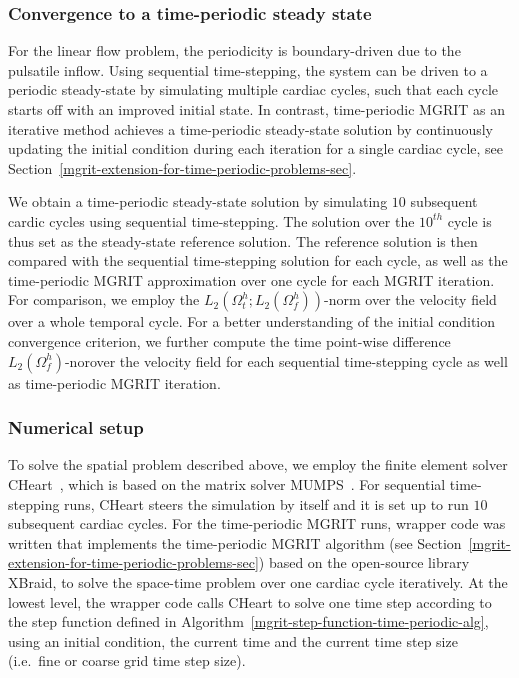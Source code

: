 \documentclass[3p]{elsarticle}
\begin{document}
\subsubsection{Convergence to a time-periodic steady state}
\label{stenosed-valve-steady-state-sec}
For the linear flow problem, the periodicity is boundary-driven
due to the pulsatile inflow.
Using sequential time-stepping, the system can be driven to a periodic steady-state
by simulating multiple cardiac cycles, such that each cycle starts off
with an improved initial state.
In contrast, time-periodic MGRIT as an iterative method
achieves a time-periodic steady-state solution by continuously
updating the initial condition during each iteration for a single cardiac cycle,
see Section~\ref{mgrit-extension-for-time-periodic-problems-sec}.

We obtain a time-periodic steady-state solution
by simulating $10$ subsequent cardic cycles using sequential time-stepping.
The solution over the $10^{th}$ cycle is thus set as the steady-state reference solution.
The reference solution is then compared with the sequential time-stepping solution for each cycle,
as well as the time-periodic MGRIT approximation over one cycle for each MGRIT iteration.
For comparison, we employ the $L_2 ( \Omega_t^h; L_2 ( \Omega_f^h ) )$-norm
over the velocity field over a whole temporal cycle.
For a better understanding of the initial condition convergence criterion,
we further compute the time point-wise difference $L_2 ( \Omega_f^h )$-norover the velocity field
for each sequential time-stepping cycle as well as time-periodic MGRIT iteration.
\subsubsection{Numerical setup}
\label{stenosed-numerical-setup-sec}
To solve the spatial problem described above,
we employ the finite element solver CHeart~\cite{LeeEtAl2016,HessenthalerRoehrleNordsletten2017},
which is based on the matrix solver MUMPS~\cite{AmestoyDuffLexcellent2000}.
For sequential time-stepping runs, CHeart steers the simulation by itself
and it is set up to run $10$ subsequent cardiac cycles.
For the time-periodic MGRIT runs, wrapper code was written
that implements the time-periodic MGRIT algorithm
(see Section~\ref{mgrit-extension-for-time-periodic-problems-sec})
based on the open-source library XBraid,
to solve the space-time problem over one cardiac cycle iteratively.
At the lowest level, the wrapper code calls CHeart to solve one time step
according to the step function defined in Algorithm~\ref{mgrit-step-function-time-periodic-alg},
using an initial condition, the current time and the current time step size
(i.e.\ fine or coarse grid time step size).
\end{document}
